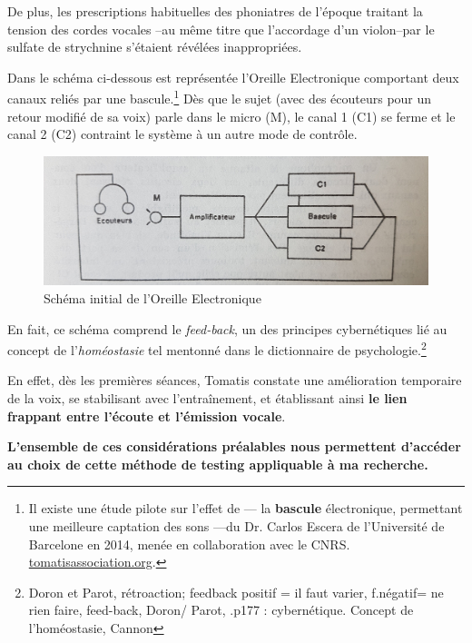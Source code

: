  De plus, les prescriptions habituelles des phoniatres de
l'époque traitant la tension des cordes vocales --au même titre que
l'accordage d'un violon--par le sulfate de
strychnine s'étaient révélées inappropriées.

Dans le schéma ci-dessous est représentée l'Oreille Electronique
comportant deux canaux reliés par une bascule.\footnote{Il existe une étude pilote sur l'effet de 
--- la \textbf{bascule} \label{bascule} électronique, permettant une meilleure
captation des sons ---du Dr. Carlos Escera
de l'Université de Barcelone en 2014, menée en collaboration avec le CNRS.
\href{http://tomatisassociation.org/scientific-validation-of-the-tomatis-effect-
eeg-recordings-of-sound-from-brainstem-to-cerebral-cortex-encoding-university-of
-barcelona-2014/}{tomatisassociation.org}.}  \label{bascule}
 Dès que le sujet (avec
des écouteurs pour un retour modifié de sa voix) parle
dans le micro (M), le canal 1 (C1) se ferme et  le canal 2 (C2) contraint le
système à un autre mode de contrôle.

\begin{figure}
	\centering
	\includegraphics[width=0.7\linewidth]{images/oreilleelectro.jpg}
	\caption[oreilleelectro]{Schéma initial de l'Oreille
          Electronique}
       
	\label{oreilleelectro}
\end{figure}


      
En fait, ce schéma comprend le\textit{ feed-back}, un des principes
cybernétiques lié au concept de l'\textit{homéostasie} tel
mentonné dans le dictionnaire de psychologie.\autocite[298]{doronparot}\footnote{Doron et Parot, rétroaction;
  feedback positif = il faut varier, f.négatif= ne rien faire,  feed-back, Doron/ Parot, .p177 : cybernétique. Concept de l'homéostasie, Cannon}



 En effet, dès les premières
séances, Tomatis constate une amélioration temporaire de la voix, se
stabilisant avec l'entraînement, et établissant ainsi
\textbf{le lien frappant entre l'écoute et
  l'émission vocale}.

\textbf{L'ensemble de ces considérations préalables nous permettent d'accéder au choix de
cette méthode de testing appliquable à ma recherche.}

